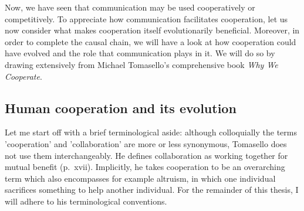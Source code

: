 Now, we have seen that communication may be used cooperatively or competitively. To appreciate how communication facilitates cooperation, let us now consider what makes cooperation itself evolutionarily beneficial. Moreover, in order to complete the causal chain, we will have a look at how cooperation could have evolved and the role that communication plays in it. We will do so by drawing extensively from Michael Tomasello's comprehensive \citeyear{Tomasello09} book \emph{Why We Cooperate}.

\subsection{Human cooperation and its evolution}
\label{sec:comm:cooperation}

Let me start off with a brief terminological aside: although colloquially the terms 'cooperation' and 'collaboration' are more or less synonymous, Tomasello does not use them interchangeably. He defines collaboration as working together for mutual benefit (p.~xvii). Implicitly, he takes cooperation to be an overarching term which also encompasses for example altruism, in which one individual sacrifices something to help another individual. For the remainder of this thesis, I will adhere to his terminological conventions.

